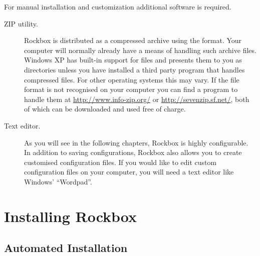 For manual installation and customization additional software is required.
\begin{description}
\item[ZIP utility.]
  Rockbox is distributed as a compressed archive using the
   format. Your computer will normally already have a means of
  handling such archive files. Windows XP has built-in support for
   files and presents them to you as directories unless you
  have installed a third party program that handles compressed files. For
  other operating systems this may vary. If the  file format
  is not recognised on your computer you can find a program to handle them
  at \url{http://www.info-zip.org/} or \url{http://sevenzip.sf.net/}, both of
  which can be downloaded and used free of charge.
\item[Text editor.] As you will see in the following chapters, Rockbox is
  highly configurable. In addition to saving configurations,
  Rockbox also allows you to create customised configuration files. If you
  would like to edit custom configuration files on your computer, you will
  need a text editor like Windows' ``Wordpad''.
\end{description}


\section{Installing Rockbox}\label{sec:installing_rockbox}


\subsection{Automated Installation}


